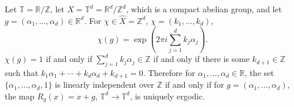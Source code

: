 \documentclass{article}
\theoremstyle{definition}
\begin{document}
Let $\mathbb{T} = \mathbb{R} / \mathbb{Z}$,  let
$X = \mathbb{T}^d = \mathbb{R}^d / \mathbb{Z}^d$, which is  a compact abelian group,
and let $g=(\alpha_1,\ldots,\alpha_d) \in \mathbb{R}^d$. 
For
$\chi \in \widehat{X} = \mathbb{Z}^d$, $\chi = (k_1,\ldots,k_d)$,
\[
\chi(g) = \exp\left(2\pi i \sum_{j=1}^d k_j \alpha_j \right).
\]
 $\chi(g)=1$ if and only if $\sum_{j=1}^d k_j \alpha_j  \in \mathbb{Z}$ if and only if there is some
 $k_{d+1} \in \mathbb{Z}$ such that $k_1\alpha_1 + \cdots + k_d\alpha_d + k_{d+1}=0$. 
 Therefore for $\alpha_1,\ldots,\alpha_d \in \mathbb{R}$, the set 
 $\{\alpha_1,\ldots,\alpha_d,1\}$ is linearly independent over $\mathbb{Z}$ if and only if
for $g=(\alpha_1,\ldots,\alpha_d)$, the map $R_g(x) = x+g$, $\mathbb{T}^d \to \mathbb{T}^d$,  is uniquely ergodic.
\end{document}
